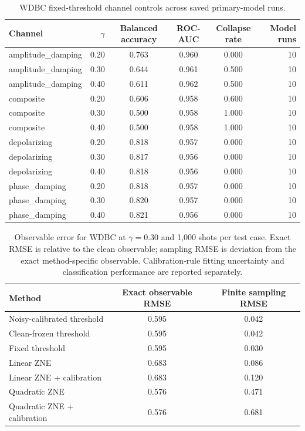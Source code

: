 \documentclass[10pt]{article}
\begin{document}
\begin{table}[t]
\centering
\caption{WDBC fixed-threshold channel controls across saved primary-model runs.}
\label{tab:channels}
\begin{tabular}{@{}l r c c c r@{}}
\toprule
Channel & $\gamma$ & Balanced accuracy & ROC-AUC & Collapse rate & Model runs \\
\midrule
amplitude\_damping & 0.20 & 0.763 & 0.960 & 0.000 & 10 \\
amplitude\_damping & 0.30 & 0.644 & 0.961 & 0.500 & 10 \\
amplitude\_damping & 0.40 & 0.611 & 0.962 & 0.500 & 10 \\
composite & 0.20 & 0.606 & 0.958 & 0.600 & 10 \\
composite & 0.30 & 0.500 & 0.958 & 1.000 & 10 \\
composite & 0.40 & 0.500 & 0.958 & 1.000 & 10 \\
depolarizing & 0.20 & 0.818 & 0.957 & 0.000 & 10 \\
depolarizing & 0.30 & 0.817 & 0.956 & 0.000 & 10 \\
depolarizing & 0.40 & 0.818 & 0.956 & 0.000 & 10 \\
phase\_damping & 0.20 & 0.818 & 0.957 & 0.000 & 10 \\
phase\_damping & 0.30 & 0.820 & 0.957 & 0.000 & 10 \\
phase\_damping & 0.40 & 0.821 & 0.956 & 0.000 & 10 \\
\bottomrule
\end{tabular}
\end{table}

\begin{table}[t]
\centering
\caption{Observable error for WDBC at $\gamma=0.30$ and 1,000 shots per test case. Exact RMSE is relative to the clean observable; sampling RMSE is deviation from the exact method-specific observable. Calibration-rule fitting uncertainty and classification performance are reported separately.}
\label{tab:errors}
\begin{tabular}{@{}l c c@{}}
\toprule
Method & Exact observable RMSE & Finite sampling RMSE \\
\midrule
Noisy-calibrated threshold & 0.595 & 0.042 \\
Clean-frozen threshold & 0.595 & 0.042 \\
Fixed threshold & 0.595 & 0.030 \\
Linear ZNE & 0.683 & 0.086 \\
Linear ZNE + calibration & 0.683 & 0.120 \\
Quadratic ZNE & 0.576 & 0.471 \\
Quadratic ZNE + calibration & 0.576 & 0.681 \\
\bottomrule
\end{tabular}
\end{table}
\end{document}
